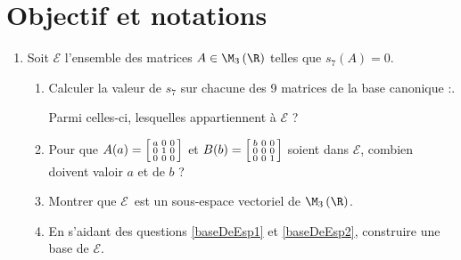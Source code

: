\documentclass[12pt]{article}
\newcommand\Esp{\mathcal{E}}
\begin{document}
\section{Objectif et notations}
\begin{enumerate}
  \item Soit \(\Esp\) l'ensemble des matrices \(A\in\M_{3}\left( \R\right) \) telles que \(s_{7}(A) =0\).
  \begin{enumerate}
    \item \label{baseDeEsp1}
      Calculer la valeur de $s_7$ sur chacune des 9 matrices de la base canonique :\quad {}.

      Parmi celles-ci, lesquelles appartiennent à $\Esp$ ? \quad {}
    \item \label{baseDeEsp2}Pour que
      $A(a) = 
      \begin{bsmallmatrix}
        a & 0 & 0 \\ 
        0 & 1 & 0 \\ 
        0 & 0 & 0 \\ 
      \end{bsmallmatrix}
      $
      et
      $B(b) = 
      \begin{bsmallmatrix}
        b & 0 & 0 \\ 
        0 & 0 & 0 \\ 
        0 & 0 & 1 \\ 
      \end{bsmallmatrix}
      $
      soient dans $\Esp$, combien doivent valoir $a$ et de $b$ ?
    \item Montrer que \(\Esp\)~est un sous-espace vectoriel de \(\M_{3}\left( \R\right) \).
    \item En s'aidant des questions \ref{baseDeEsp1} et \ref{baseDeEsp2}, construire une base de $\Esp$.
      \par {}
  \end{enumerate}
\end{enumerate}
\end{document}
